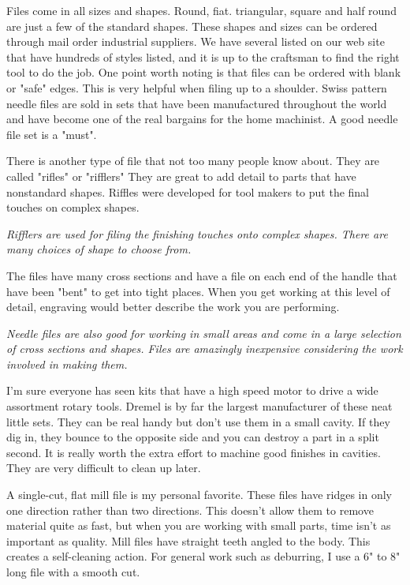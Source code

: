 
Files come in all sizes and shapes. Round, fiat. triangular, square and half
round are just a few of the standard shapes. These shapes and sizes can be
ordered through mail order industrial suppliers. We have several listed on our
web site that have hundreds of styles listed, and it is up to the craftsman to
find the right tool to do the job. One point worth noting is that files can be
ordered with blank or "safe" edges. This is very helpful when filing up to a
shoulder. Swiss pattern needle files are sold in sets that have been
manufactured throughout the world and have become one of the real bargains for
the home machinist. A good needle file set is a "must".


There is another type of file that not too many people know about. They are
called "rifles" or "rifflers" They are great to add detail to parts that have
nonstandard shapes. Riffles were developed for tool makers to put the final
touches on complex shapes.

\bigskip
\textit{Rifflers are used for filing the finishing touches onto complex shapes.
There are many choices of shape to choose from.}
\bigskip

The files have many cross sections and have a file on each end of the handle
that have been "bent" to get into tight places. When you get working at this
level of detail, engraving would better describe the work you are performing.

\bigskip
\textit{Needle files are also good for working in small areas and come in a
large selection of cross sections and shapes. Files are amazingly inexpensive
considering the work involved in making them.}
\bigskip


I'm sure everyone has seen kits that have a high speed motor to drive a wide
assortment rotary tools. Dremel is by far the largest manufacturer of these neat
little sets. They can be real handy but don't use them in a small cavity. If
they dig in, they bounce to the opposite side and you can destroy a part in a
split second. It is really worth the extra effort to machine good finishes in
cavities. They are very difficult to clean up later.


A single-cut, flat mill file is my personal favorite. These files have ridges in
only one direction rather than two directions. This doesn't allow them to remove
material quite as fast, but when you are working with small parts, time isn't as
important as quality. Mill files have straight teeth angled to the body. This
creates a self-cleaning action. For general work such as deburring, I use a 6"
to 8" long file with a smooth cut.

